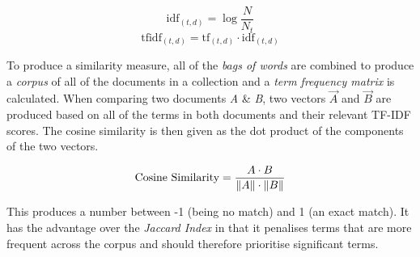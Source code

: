 \documentclass[../report.tex]{subfiles}
\begin{document}
	$$ \text{idf}_{(t,d)} = \log{\frac{N}{N_{t}}}$$
	$$ \text{tfidf}_{(t, d)} = \text{tf}_{(t,d)} \cdot \text{idf}_{(t,d)} $$
	
	To produce a similarity measure, all of the \textit{bags of words} are combined to produce a \textit{corpus} of all of the documents in a collection and a \textit{term frequency matrix} is calculated.  When comparing two documents \textit{A} \& \textit{B}, two vectors $\overrightarrow{A}$ and $\overrightarrow{B}$ are produced based on all of the terms in both documents and their relevant TF-IDF scores.  The cosine similarity is then given as the dot product of the components of the two vectors.
	
	$$ \text{Cosine Similarity} = \frac{A \cdot B}{\norm{A} \cdot \norm{B}} $$
	
	This produces a number between -1 (being no match) and 1 (an exact match).  It has the advantage over the \textit{Jaccard Index} in that it penalises terms that are more frequent across the corpus and should therefore prioritise significant terms.
\end{document}
